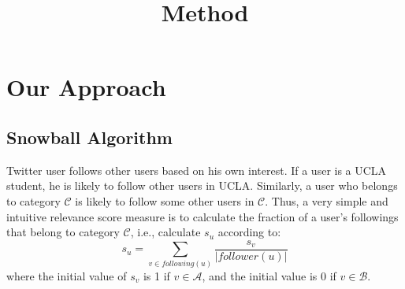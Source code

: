 \documentclass{article}
\begin{document}
\title{Method}

\newcommand{\following}{\ensuremath{following}}
\newcommand{\follower}{\ensuremath{follower}}

\maketitle \else \fi

\newcommand{\argmax}{\operatornamewithlimits{argmax}}

\section{Our Approach}\label{sec:method}

\subsection{Snowball Algorithm}
Twitter user follows other users based on his own interest. If a user is a UCLA student, he is likely to follow other users in UCLA. Similarly, a user who belongs to category $\mathcal{C}$ is likely to follow some other users in $\mathcal{C}$. Thus, a very simple and intuitive relevance score measure is to calculate the fraction of a user's followings that belong to category $\mathcal{C}$, i.e., calculate $s_u$ according to:
\begin{equation}\label{eq:snowball}
s_u = \sum_{v \in \following(u)} \frac{s_v}{|\follower(u)|}
\end{equation}
where the initial value of $s_v$ is 1 if $v \in \mathcal{A}$, and the initial value is 0 if $v \in \mathcal{B}$.


\end{document}
